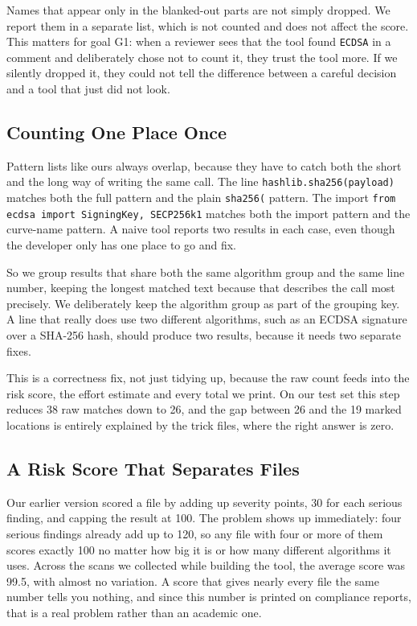 \documentclass[runningheads]{llncs}
\begin{document}
Names that appear only in the blanked-out parts are not simply dropped. We
report them in a separate list, which is not counted and does not affect the
score. This matters for goal G1: when a reviewer sees that the tool found
\texttt{ECDSA} in a comment and deliberately chose not to count it, they trust
the tool more. If we silently dropped it, they could not tell the difference
between a careful decision and a tool that just did not look.

\subsection{Counting One Place Once}
\label{sec:dedup}

Pattern lists like ours always overlap, because they have to catch both the
short and the long way of writing the same call. The line
\texttt{hashlib.sha256(payload)} matches both the full pattern and the plain
\texttt{sha256(} pattern. The import \texttt{from ecdsa import SigningKey,
SECP256k1} matches both the import pattern and the curve-name pattern. A naive
tool reports two results in each case, even though the developer only has one
place to go and fix.

So we group results that share both the same algorithm group and the same line
number, keeping the longest matched text because that describes the call most
precisely. We deliberately keep the algorithm group as part of the grouping key.
A line that really does use two different algorithms, such as an ECDSA signature
over a SHA-256 hash, should produce two results, because it needs two separate
fixes.

This is a correctness fix, not just tidying up, because the raw count feeds into
the risk score, the effort estimate and every total we print. On our test set
this step reduces 38 raw matches down to 26, and the gap between 26 and the 19
marked locations is entirely explained by the trick files, where the right
answer is zero.

\subsection{A Risk Score That Separates Files}
\label{sec:scoring}

Our earlier version scored a file by adding up severity points, 30 for each
serious finding, and capping the result at 100. The problem shows up
immediately: four serious findings already add up to 120, so any file with four
or more of them scores exactly 100 no matter how big it is or how many different
algorithms it uses. Across the scans we collected while building the tool, the
average score was 99.5, with almost no variation. A score that gives nearly
every file the same number tells you nothing, and since this number is printed
on compliance reports, that is a real problem rather than an academic one.
\end{document}
